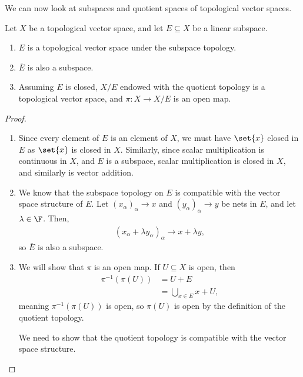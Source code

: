 \documentclass[10pt]{mypackage}
\begin{document}
We can now look at subspaces and quotient spaces of topological vector spaces.
\begin{proposition}
  Let $X$ be a topological vector space, and let $E\subseteq X$ be a linear subspace.
  \begin{enumerate}[(1)]
    \item $E$ is a topological vector space under the subspace topology.
    \item $\overline{E}$ is also a subspace.
    \item Assuming $E$ is closed, $X/E$ endowed with the quotient topology is a topological vector space, and $\pi: X\rightarrow X/E$ is an open map.
  \end{enumerate}
\end{proposition}
\begin{proof}\hfill
  \begin{enumerate}[(1)]
    \item Since every element of $E$ is an element of $X$, we must have $\set{x}$ closed in $E$ as $\set{x}$ is closed in $X$. Similarly, since scalar multiplication is continuous in $X$, and $E$ is a subspace, scalar multiplication is closed in $X$, and similarly is vector addition.
    \item We know that the subspace topology on $E$ is compatible with the vector space structure of $E$. Let $\left(x_{\alpha}\right)_{\alpha}\rightarrow x$ and $\left(y_{\alpha}\right)_{\alpha}\rightarrow y$ be nets in $E$, and let $\lambda\in \F$. Then,
      \begin{align*}
        \left(x_{\alpha} + \lambda y_{\alpha}\right)_{\alpha}\rightarrow x + \lambda y,
      \end{align*}
      so $\overline{E}$ is also a subspace.
    \item We will show that $\pi$ is an open map. If $U\subseteq X$ is open, then
      \begin{align*}
        \pi^{-1}\left(\pi\left(U\right)\right) &= U + E\\
                                               &= \bigcup_{x\in E}x + U,
      \end{align*}
      meaning $\pi^{-1}\left(\pi\left(U\right)\right)$ is open, so $\pi\left(U\right)$ is open by the definition of the quotient topology.\newline

      We need to show that the quotient topology is compatible with the vector space structure.\newline


\end{enumerate}
\end{proof}
\end{document}
